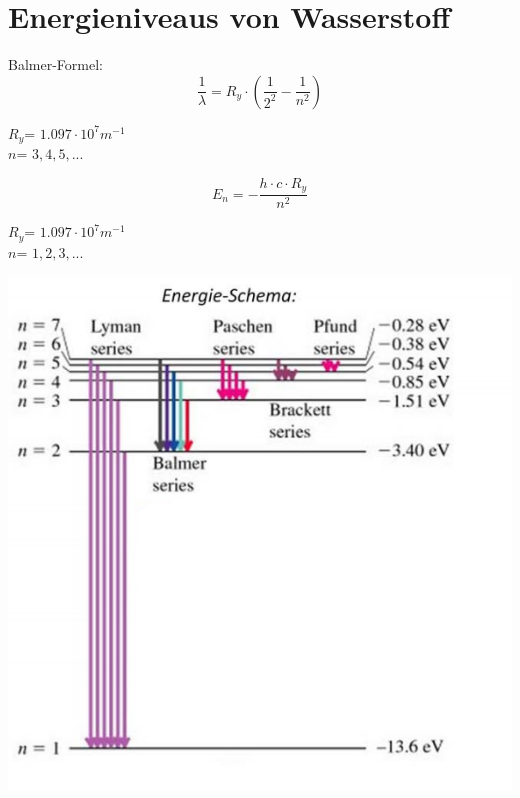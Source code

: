 \section{Energieniveaus von Wasserstoff}
Balmer-Formel:
\[
	\frac{1}{\lambda}=R_y\cdot \left( \frac{1}{2^2} - \frac{1}{n^2}\right) 
\]
\begin{footnotesize}
	$R_y$=	$1.097\cdot 10^7 m^{-1}$\\
	$n$=	$3,4,5,...$ \\
\end{footnotesize}
\[
	E_n= -\frac{h\cdot c \cdot R_y}{n^2}
\]
\begin{footnotesize}
	$R_y$=	$1.097\cdot 10^7 m^{-1}$\\
	$n$=	$1,2,3,...$ \\
\end{footnotesize}
\begin{center}
	\includegraphics[scale = 0.25]{images/en_H.jpg}
\end{center}
\

